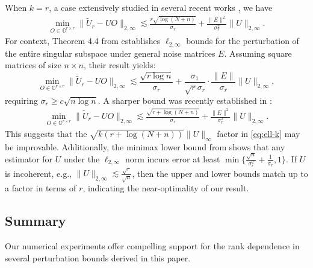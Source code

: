 \documentclass[reqno]{amsart}
\theoremstyle{plain}
\theoremstyle{definition}
\begin{document}
When \(k = r\), a case extensively studied in several recent works \cite{YCF21,YW24,CCFM21}, we have
\begin{align*}
\min_{O\in \mathbb O^{r\times r}} \| \widetilde{U}_{r} - U O \|_{2,\infty} \lesssim  \frac{r\sqrt{\log(N+n)}}{\sigma_r}  +  \frac{\|E\|^2}{\sigma_r^2} \|U\|_{2,\infty}.
\end{align*}
For context, Theorem 4.4 from \cite{CWC21} establishes $\ell_{2,\infty}$ bounds for the perturbation of the entire singular subspace under general noise matrices $E$.  Assuming square matrices of size $n \times n$, their result  yields:
\[
\min_{O \in \mathbb{O}^{r \times r}} \|\widetilde{U}_r - U O\|_{2,\infty} \lesssim \frac{\sqrt{r \log n}}{\sigma_r} + \frac{\sigma_1}{\sqrt{r} \sigma_r} \cdot \frac{\|E\|}{\sigma_r} \|U\|_{2,\infty},
\]
requiring $\sigma_r \ge c \sqrt{n \log n}$.
A sharper bound was recently established in \cite[Proposition 2]{YW24}:
\begin{align*}
\min_{O\in \mathbb O^{r\times r}} \| \widetilde{U}_{r} - U O \|_{2,\infty} \lesssim  \frac{\sqrt{r+\log(N+n)}}{\sigma_r}  +  \frac{\|E\|^2}{\sigma_r^2} \|U\|_{2,\infty}.
\end{align*}
This suggests that the \(\sqrt{k(r + \log(N+n))} \|U\|_{\infty}\) factor in \eqref{eq:ell-k} may be improvable. Additionally, the minimax lower bound from \cite[Theorem 2]{CLCPC21} shows that any estimator for $U$ under the $\ell_{2,\infty}$ norm incurs error at least $\min\{\frac{\sqrt{n}}{\sigma_r^2} +  \frac{1}{\sigma_r}, 1\}.$ If \(U\) is incoherent, e.g., \(\|U\|_{2,\infty} \lesssim \frac{\sqrt{r}}{\sqrt{n}}\), then the upper and lower bounds match up to a factor in terms of \(r\), indicating the near-optimality of our result.

\subsection{Summary}

Our numerical experiments offer compelling support for the rank dependence in several perturbation bounds derived in this paper.
\end{document}
